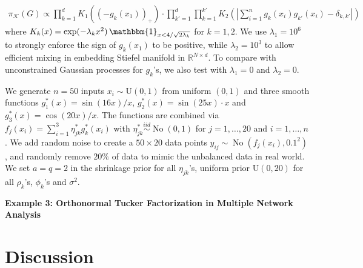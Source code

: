 \documentclass[10pt]{article}
\newcommand{\mc}[1]{\mathcal{#1}}
\DeclareMathOperator{\No}{No}
\DeclareMathOperator{\1}{\mathbbm{1}}
\begin{document}
 \begin{equation*}
\begin{aligned}
\pi_{\mc K}(G) \propto   \prod_{k=1}^{d} K_{1}{\left((-g_k(x_1) )_+\right)} \cdot \prod_{k'=1}^{d}\prod_{k=1}^{k'} K_2 ( |\sum_{i=1}^n g_k(x_i) g_{k'}(x_i) - \delta_{k,k'}|)
\end{aligned}
\end{equation*}
where $K_{k}(x)=\exp(- \lambda_k x^2) \1_{x<4/\sqrt{2\lambda_k}}$ for  $k=1,2$. We use $\lambda_1 = 10^6$ to strongly enforce the sign of $g_k(x_1)$ to be positive, while $\lambda_2 = 10^3$ to allow efficient mixing in embedding Stiefel manifold in $\mathbb{R}^{N\times d}$. To compare with unconstrained Gaussian processes for $g_k$'s, we also test with $\lambda_1=0$ and $\lambda_2=0$.

We generate $n=50$ inputs $x_i\sim \text{U}(0,1)$ from uniform $(0,1)$ and three smooth functions $g^*_1(x)= \sin(16 x)/x$, $g^*_2(x)= \sin(25 x)\cdot x$ and $g^*_3(x)= \cos(20 x)/x$. The functions are combined via $f_j(x_i)=\sum_{i=1}^3 \eta^*_{jk} g^*_k(x_i)$ with $\eta^*_{jk}\stackrel{iid}{\sim} \No(0,1)$ for $j=1,\ldots,20$ and $i=1,\ldots,n$. We add random noise to create a $50\times 20$ data points $y_{ij} \sim \No(f_j(x_i),0.1^2)$, and randomly remove $20\%$ of data to mimic the unbalanced data in real world. We set $a=q=2$ in the shrinkage prior for all $\eta_{jk}$'s, uniform prior $\text{U}(0,20)$ for all $\rho_k$'s, $\phi_k$'s and $\sigma^2$.

{\bf Example 3: Orthonormal Tucker Factorization in Multiple Network Analysis}


\section{Discussion}





\end{document}
